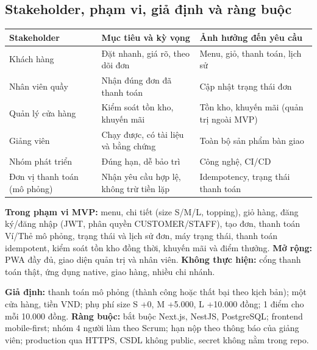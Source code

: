 \documentclass[a4paper]{article}
\begin{document}
\subsection{Stakeholder, phạm vi, giả định và ràng buộc}
\begin{center}
\small\everymath{}
\begin{tabular}{@{}p{2.7cm}p{5.2cm}p{5.8cm}@{}}
\toprule
\textbf{Stakeholder} & \textbf{Mục tiêu và kỳ vọng} & \textbf{Ảnh hưởng đến yêu cầu} \\ \midrule
Khách hàng & Đặt nhanh, giá rõ, theo dõi đơn & Menu, giỏ, thanh toán, lịch sử \\
Nhân viên quầy & Nhận đúng đơn đã thanh toán & Cập nhật trạng thái đơn \\
Quản lý cửa hàng & Kiểm soát tồn kho, khuyến mãi & Tồn kho, khuyến mãi (quản trị ngoài MVP) \\
Giảng viên & Chạy được, có tài liệu và bằng chứng & Toàn bộ sản phẩm bàn giao \\
Nhóm phát triển & Đúng hạn, dễ bảo trì & Công nghệ, CI/CD \\
Đơn vị thanh toán (mô phỏng) & Nhận yêu cầu hợp lệ, không trừ tiền lặp & Idempotency, trạng thái thanh toán \\
\bottomrule
\end{tabular}
\end{center}
\textbf{Trong phạm vi MVP:} menu, chi tiết (size S/M/L, topping), giỏ hàng, đăng ký/đăng nhập (JWT, phân quyền CUSTOMER/STAFF), tạo đơn, thanh toán Ví/Thẻ mô phỏng, trạng thái và lịch sử đơn, máy trạng thái, thanh toán idempotent, kiểm soát tồn kho đồng thời, khuyến mãi và điểm thưởng. \textbf{Mở rộng:} PWA đầy đủ, giao diện quản trị và nhân viên. \textbf{Không thực hiện:} cổng thanh toán thật, ứng dụng native, giao hàng, nhiều chi nhánh.

\textbf{Giả định:} thanh toán mô phỏng (thành công hoặc thất bại theo kịch bản); một cửa hàng, tiền VND; phụ phí size S +0, M +5.000, L +10.000 đồng; 1 điểm cho mỗi 10.000 đồng. \textbf{Ràng buộc:} bắt buộc Next.js, NestJS, PostgreSQL; frontend mobile-first; nhóm 4 người làm theo Scrum; hạn nộp theo thông báo của giảng viên; production qua HTTPS, CSDL không public, secret không nằm trong repo.
\end{document}
